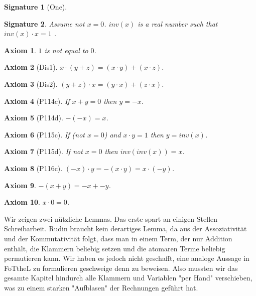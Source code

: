 \documentclass{article}
\newenvironment{forthel}{\begin{leftbar}}{\end{leftbar}}
\newtheorem{axiom}{Axiom}
\newtheorem{signature}{Signature}
\begin{document}
\begin{forthel}
\begin{signature}[One]
\end{signature}
\begin{signature} Assume not $x = 0$. $inv(x)$ is a real number such that $inv(x)\cdot x = 1$ .

\end{signature}
\begin{axiom} $1$ is not equal to $0$.

\end{axiom}

\begin{axiom}[Dis1] $x\cdot(y+z)=(x\cdot y)+(x\cdot z)$.

\end{axiom}
\begin{axiom}[Dis2] $(y+z) \cdot x=(y \cdot x)+(z \cdot x)$.

\end{axiom}


\begin{axiom}[P114c] If $x+y = 0$ then $y = -x$.

\end{axiom}
\begin{axiom}[P114d] $-(-x) = x$.

\end{axiom}
\begin{axiom}[P115c] If (not $x=0$) and $x\cdot y = 1$ then $y = inv(x)$.  

\end{axiom}
\begin{axiom}[P115d] If not $x=0$ then $inv(inv(x)) = x$.

\end{axiom}
\begin{axiom}[P116c] $(-x)\cdot y = -(x\cdot y) = x \cdot (-y)$.

\end{axiom}

\begin{axiom} $-(x+y) = -x + -y$. 

\end{axiom}
\begin{axiom} $x \cdot 0 = 0$. 

\end{axiom}

\end{forthel}
Wir zeigen zwei nützliche Lemmas. Das erste spart an einigen Stellen Schreibarbeit. Rudin braucht kein derartiges Lemma, da aus der Assoziativität und der Kommutativität folgt, dass man in einem Term, der nur Addition enthält, die Klammern beliebig setzen und die atomaren Terme beliebig permutieren kann. Wir haben es jedoch nicht geschafft, eine analoge Aussage in FoTtheL zu formulieren geschweige denn zu beweisen. Also mussten wir das gesamte Kapitel hindurch alle Klammern und Variablen "per Hand" verschieben, was zu einem starken "Aufblasen" der Rechnungen geführt hat.\newline
\end{document}
